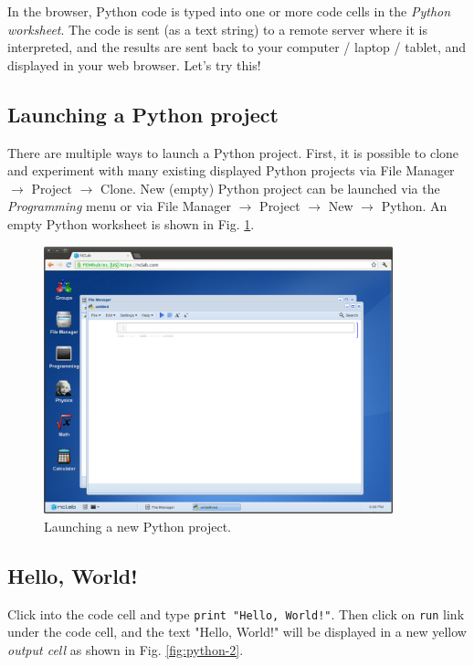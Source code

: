 In the browser, Python code is typed into one or more code cells in the {\em Python worksheet}. 
The code is sent (as a text string) to a remote server where it is interpreted, and the 
results are sent back to your computer / laptop / tablet, and displayed in your web 
browser.  Let's try this!

\subsection{Launching a Python project}

There are multiple ways to launch a Python project. First, it is 
possible to clone and experiment with many existing displayed Python 
projects via File Manager $\rightarrow$ 
Project $\rightarrow$ Clone. New (empty) Python project can be launched via 
the {\em Programming} menu or via File Manager $\rightarrow$ 
Project $\rightarrow$ New $\rightarrow$ Python. An empty Python worksheet
is shown in Fig. \ref{fig:python}.

\newpage
\begin{figure}[!ht]
\begin{center}
\includegraphics[width=0.9\textwidth]{imgp/python.png}
\end{center}
\vspace{-2mm}
\caption{Launching a new Python project.}
\label{fig:python}
\end{figure}


\subsection{Hello, World!}

Click into the code cell and type {\tt print "Hello, World!"}.
Then click on {\tt run} link under the code cell, and the text 
"Hello, World!" will be displayed 
in a new yellow {\em output cell} as shown in Fig. \ref{fig:python-2}.

